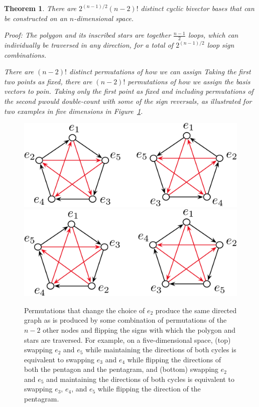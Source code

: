 \documentclass[11pt]{article}
\newcommand{\bv}[1][]{e_{#1}}
\newtheorem{theorem}{Theorem}[section]
\begin{document}
\begin{theorem}{There are $2^{(n-1)/2} (n-2)!$ distinct cyclic bivector bases that can be constructed on an $n$-dimensional space.} \label{thm:numberofcyclicbivectorbases}

Proof: The polygon and its inscribed stars are together $\frac{n-1}{2}$ loops, which can individually be traversed in any direction, for a total of $2^{(n-1)/2}$ loop sign combinations. 

There are $(n-2)!$ distinct permutations of how we can assign
Taking the first two points as fixed, there are $(n-2)!$ permutations of how we assign the basis vectors to poin. Taking only the first point as fixed and including permutations of the second pwould double-count with some of the sign reversals, as illustrated for two examples in five dimensions in Figure~\ref{fig:noneedtopermute}.%

\end{theorem}

\begin{figure}[tbp]
\begin{center}
\includegraphics[width=.75\textwidth]{NoNeedToPermute2.pdf}\\
\includegraphics[width=.75\textwidth]{NoNeedToPermute2altalt.pdf}
\caption{%
Permutations that change the choice of $\bv[2]$ produce the same directed graph as is produced by some combination of permutations of the $n-2$ other nodes and flipping the signs with which the polygon and stars are traversed. For example, on a five-dimensional space, (top) swapping $\bv[2]$ and $\bv[5]$ while maintaining the directions of both cycles is equivalent to swapping $\bv[3]$ and $\bv[4]$ while flipping the directions of both the pentagon and the pentagram, and (bottom) swapping $\bv[2]$ and $\bv[5]$ and maintaining the directions of both cycles is equivalent to swapping $\bv[3]$, $\bv[4]$, and $\bv[5]$ while flipping the direction of the pentagram.
}
\label{fig:noneedtopermute}
\end{center}
\end{figure}
\end{document}
